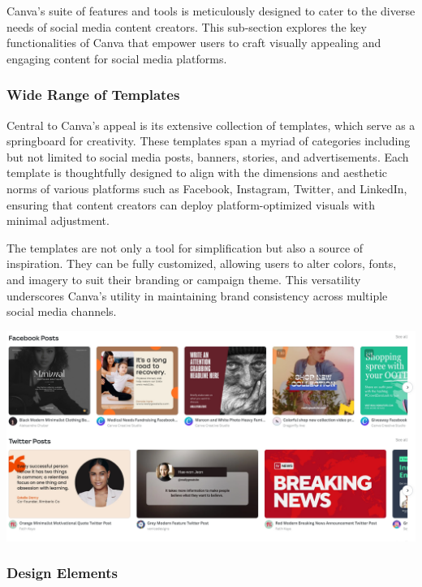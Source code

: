 \documentclass[
]{book}
\begin{document}
Canva's suite of features and tools is meticulously designed to cater to the diverse needs of social media content creators. This sub-section explores the key functionalities of Canva that empower users to craft visually appealing and engaging content for social media platforms.

\hypertarget{wide-range-of-templates}{%
\subsubsection*{Wide Range of Templates}\label{wide-range-of-templates}}

Central to Canva's appeal is its extensive collection of templates, which serve as a springboard for creativity. These templates span a myriad of categories including but not limited to social media posts, banners, stories, and advertisements. Each template is thoughtfully designed to align with the dimensions and aesthetic norms of various platforms such as Facebook, Instagram, Twitter, and LinkedIn, ensuring that content creators can deploy platform-optimized visuals with minimal adjustment.

The templates are not only a tool for simplification but also a source of inspiration. They can be fully customized, allowing users to alter colors, fonts, and imagery to suit their branding or campaign theme. This versatility underscores Canva's utility in maintaining brand consistency across multiple social media channels.

\href{https://www.canva.com/templates/}{\includegraphics[width=1\textwidth,height=\textheight]{images/clipboard-143261966.png}}

\hypertarget{design-elements}{%
\subsubsection*{Design Elements}\label{design-elements}}
\end{document}
